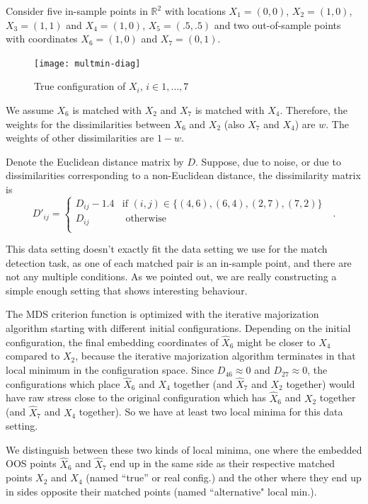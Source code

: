 \documentclass[12pt,oneside,final]{thesis}\usepackage[]{graphicx}\usepackage[]{color}
\begin{document}

Consider five in-sample points in $\mathbb{R}^2$ with locations $X_1=(0,0)$, $X_2=(1,0)$, $X_3=(1,1)$
and $X_4=(1,0)$, $X_5=(.5,.5)$ and two out-of-sample  points with coordinates $X_6=(1,0)$ and $X_7=(0,1)$.
\begin{figure}
\centering
\texttt{[image: multmin-diag]}
\caption{True configuration of $X_{i}$, $i \in {1,\ldots,7}$}
\label{original-config}
\end{figure} 
We assume $X_6$ is matched with $X_2$ and $X_7$ is matched with $X_4$. Therefore, the weights for the dissimilarities between $X_6$ and  $X_2$ (also  $X_7$ and $X_4$)  are $w$. The weights of other dissimilarities are $1-w$.

Denote the Euclidean distance matrix by $D$. 
Suppose, due to noise, or due to dissimilarities corresponding to a non-Euclidean distance, 
the dissimilarity matrix is $$D'_{ij}=\begin{cases}
D_{ij}-1.4 & \textrm{if  $(i,j) \in \{(4,6),(6,4),(2,7),(7,2)   \}$ }\\
D_{ij}  & \textrm{ otherwise}\\
\end{cases}.$$ 

\begin{remark}
This data setting doesn't exactly fit the data setting we use for the match detection task, as one of each matched pair is an in-sample point, and there are not any multiple conditions. As we pointed out, we are really constructing  a  simple  enough setting that shows interesting behaviour.
\end{remark}

The MDS criterion function is optimized with the iterative majorization algorithm starting with different initial configurations.   Depending on the initial configuration, the final embedding coordinates of $\hat{X}_6$ might be closer
to $X_4$ compared to $X_2$, because the iterative majorization algorithm terminates in that  local minimum in the configuration space. Since $D_{46}\approx 0$ and $D_{27}\approx 0$, the configurations  which place $\hat{X}_6$ and $X_4$ together (and $\hat{X}_7$ and $X_2$ together) would have  raw stress  close to the  original  configuration which has $\hat{X}_6$ and $X_2$ together (and $\hat{X}_7$ and $X_4$ together). So we have at least two local minima for this data setting.

We distinguish between these two kinds of local minima, one where the embedded OOS points $\hat{X}_6$ and $\hat{X}_7$ end up in the same side as their respective matched points $X_2$ and $X_4$ (named ``true'' or real config.) and the other where they end up in sides  opposite their matched points (named ``alternative" local min.). 
\end{document}
